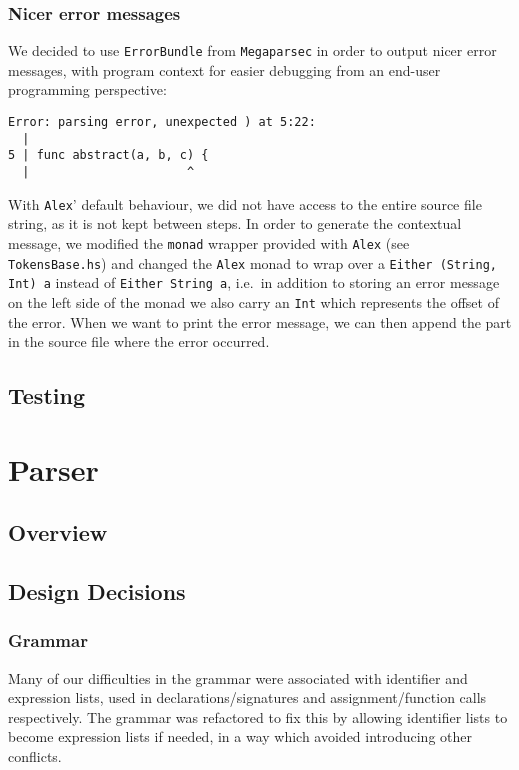 \documentclass[11pt]{article}
\begin{document}
\subsubsection{Nicer error messages}
We decided to use \texttt{ErrorBundle} from \texttt{Megaparsec} in order to
output nicer error messages, with program context for easier
debugging from an end-user programming perspective:

\begin{verbatim}
Error: parsing error, unexpected ) at 5:22:
  |
5 | func abstract(a, b, c) {
  |                      ^
\end{verbatim}

With \texttt{Alex}' default behaviour, we did not have access to the entire
source file string, as it is not kept between steps. In order to
generate the contextual message, we modified the \texttt{monad} wrapper
provided with \texttt{Alex} (see \texttt{TokensBase.hs}) and changed the \texttt{Alex}
monad to wrap over a \texttt{Either (String, Int) a} instead of
\texttt{Either String a}, i.e.\ in addition to storing an error message on
the left side of the monad we also carry an \texttt{Int} which represents
the offset of the error. When we want to print the error
message, we can then append the part in the source file where
the error occurred.

\subsection{Testing}
\section{Parser}
\subsection{Overview}
\subsection{Design Decisions}
\subsubsection{Grammar}
Many of our difficulties in the grammar were associated with identifier and
expression lists, used in declarations/signatures and assignment/function
calls respectively. The grammar was refactored to fix this by allowing
identifier lists to become expression lists if needed, in a way which
avoided introducing other conflicts.
\end{document}
